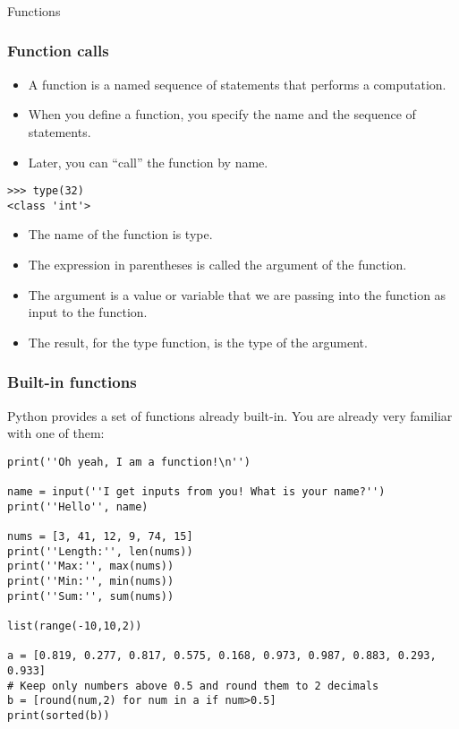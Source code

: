 \begin{frame}[fragile]\frametitle{}
\begin{center}
{\Large Functions}
\end{center}
\end{frame}


\begin{frame}[fragile]\frametitle{Function calls}
    \begin{itemize}
    \item  A function is a named sequence of statements that
performs a computation. 
    \item  When you define a function, you specify the name and
the sequence of statements. 
    \item  Later, you can ``call'' the function by name.
    \end{itemize}
\begin{lstlisting}
>>> type(32)
<class 'int'>
\end{lstlisting}
    \begin{itemize}
    \item  The name of the function is type. 
    \item The expression in parentheses is called the argument of the function. 
    \item The argument is a value or variable that we are passing into the function as input to the function.
    \item The result, for the type function, is the type of the argument.
    \end{itemize}
\end{frame}

\begin{frame}[fragile]\frametitle{Built-in functions}
Python provides a set of functions already built-in. You are already very familiar with one of them:
\begin{lstlisting}
print(''Oh yeah, I am a function!\n'')

name = input(''I get inputs from you! What is your name?'')
print(''Hello'', name)

nums = [3, 41, 12, 9, 74, 15]
print(''Length:'', len(nums))
print(''Max:'', max(nums))
print(''Min:'', min(nums))
print(''Sum:'', sum(nums))

list(range(-10,10,2))

a = [0.819, 0.277, 0.817, 0.575, 0.168, 0.973, 0.987, 0.883, 0.293, 0.933]
# Keep only numbers above 0.5 and round them to 2 decimals
b = [round(num,2) for num in a if num>0.5]
print(sorted(b))
\end{lstlisting}
\end{frame}


